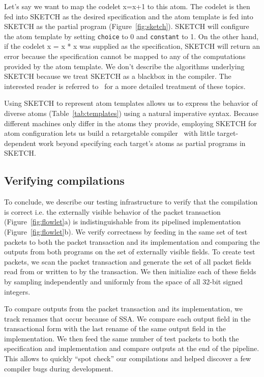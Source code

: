 Let's say we want to map the codelet x=x+1 to this atom. The codelet is then
fed into SKETCH as the desired specification and the atom template is fed into
SKETCH as the partial program (Figure~\ref{fig:sketch}). SKETCH will configure
the atom template by setting \texttt{choice} to 0 and \texttt{constant} to 1.
On the other hand, if the codelet x = x * x was supplied as the specification,
SKETCH will return an error because the specification cannot be mapped to any
of the computations provided by the atom template. We don't describe the
algorithms underlying SKETCH because we treat SKETCH as a blackbox in the
\pktlanguage compiler. The interested reader is referred to~\cite{bitstreaming,
sketch_asplos} for a more detailed treatment of these topics.

Using SKETCH to represent atom templates allows us to express the behavior of
diverse atoms (Table~\ref{tab:templates}) using a natural imperative syntax.
Because different \absmachine machines only differ in the atoms they provide,
employing SKETCH for atom configuration lets us build a retargetable
compiler~\cite{lcc} with little target-dependent work beyond specifying each
target's atoms as partial programs in SKETCH.

\subsection{Verifying compilations}
\label{ss:verification}

To conclude, we describe our testing infrastructure to verify that the
compilation is correct i.e. the externally visible behavior of the packet
transaction (Figure~\ref{fig:flowlet}a) is indistinguishable from its pipelined
implementation (Figure~\ref{fig:flowlet}b). We verify correctness by feeding in
the same set of test packets to both the packet transaction and its
implementation and comparing the outputs from both programs on the set of
externally visible fields. To create test packets, we scan the packet
transaction and generate the set of all packet fields read from or written to
by the transaction. We then initialize each of these fields by sampling
independently and uniformly from the space of all 32-bit signed integers.

To compare outputs from the packet transaction and its implementation, we track
renames that occur because of SSA. We compare each output field in the
transactional form with the last rename of the same output field in the
implementation. We then feed the same number of test packets to both the
specification and implementation and compare outputs at the end of the
pipeline. This allows to quickly ``spot check'' our compilations and
helped discover a few compiler bugs during development.

